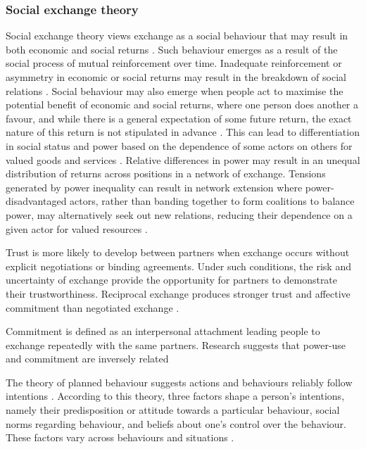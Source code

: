 \subsubsection{Social exchange theory}

Social exchange theory views exchange as a social behaviour that may result in both economic and social returns \citep{lambe2001social}. Such behaviour emerges as a result of the social process of mutual reinforcement over time. Inadequate reinforcement or asymmetry in economic or social returns may result in the breakdown of social relations \citep{homans1961social}. Social behaviour may also emerge when people act to maximise the potential benefit of economic and social returns, where one person does another a favour, and while there is a general expectation of some future return, the exact nature of this return is not stipulated in advance \citep{blau1986exchange}. This can lead to differentiation in social status and power based on the dependence of some actors on others for valued goods and services \citep{emerson1962power}. Relative differences in power may result in an unequal distribution of returns across positions in a network of exchange. Tensions generated by power inequality can result in network extension where power-disadvantaged actors, rather than banding together to form coalitions to balance power, may alternatively seek out new relations, reducing their dependence on a given actor for valued resources \citep{cook2013social}. 

Trust is more likely to develop between partners when exchange occurs without explicit negotiations or binding agreements. Under such conditions, the risk and uncertainty of exchange provide the opportunity for partners to demonstrate their trustworthiness. Reciprocal exchange produces stronger trust and affective commitment than negotiated exchange \citep{molm2000risk}. 

Commitment is defined as an interpersonal attachment leading people to exchange repeatedly with the same partners. Research suggests that power-use and commitment are inversely related \citep{cook1978power}

The theory of planned behaviour suggests actions and behaviours reliably follow intentions \citep{ajzen1985intentions}. According to this theory, three factors shape a person's intentions, namely their predisposition or attitude towards a particular behaviour, social norms regarding behaviour, and beliefs about one's control over the behaviour. These factors vary across behaviours and situations \citep{ajzen1991theory}. \medskip


